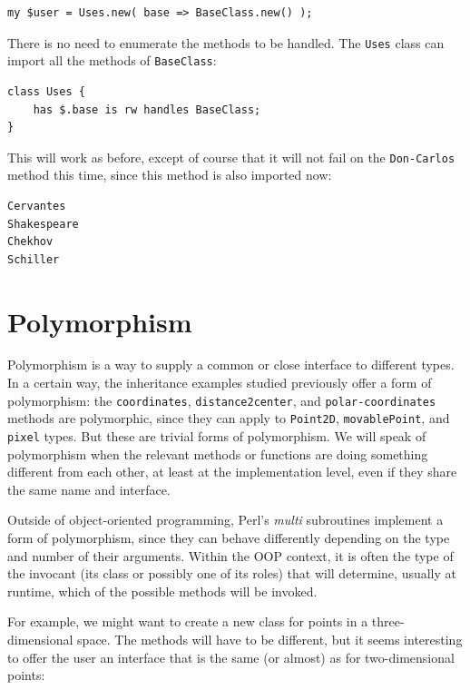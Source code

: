\begin{verbatim}
my $user = Uses.new( base => BaseClass.new() );
\end{verbatim}

There is no need to enumerate the methods to be handled. The 
{\tt Uses} class can import all the methods of {\tt BaseClass}:

\begin{verbatim}
class Uses { 
    has $.base is rw handles BaseClass;
}
\end{verbatim}

This will work as before, except of course that it will not fail 
on the {\tt Don-Carlos} method this time, since this method is 
also imported now:

\begin{verbatim}
Cervantes
Shakespeare
Chekhov
Schiller
\end{verbatim} 

\section{Polymorphism}

Polymorphism is a way to supply a common or close interface 
to different types. In a certain way, the inheritance examples 
studied previously offer a form of polymorphism: the 
{\tt coordinates}, {\tt distance2center}, and {\tt polar-coordinates} 
methods are polymorphic, since they can apply to 
{\tt Point2D}, {\tt movablePoint}, and {\tt pixel} types. But 
these are trivial forms of polymorphism. We will speak of 
polymorphism when the relevant methods or functions are 
doing something different from each other, at least at the 
implementation level, even if they share the same name and 
interface.

Outside of object-oriented programming, Perl's 
\emph{multi} subroutines implement a form of polymorphism, 
since they can behave differently depending on the 
type and number of their arguments. Within the OOP context, 
it is often the type of the invocant (its class or possibly one 
of its roles) that will determine, usually at runtime, 
which of the possible methods will be invoked.

For example, we might want to create a new class for points 
in a three-dimensional space. The methods will have to be 
different, but it seems interesting to offer the user an 
interface that is the same (or almost) as for two-dimensional 
points:

